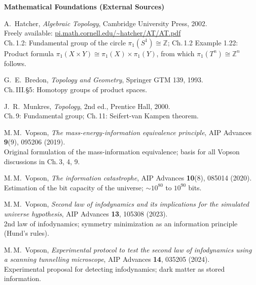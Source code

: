 \bigskip
\noindent\textbf{Mathematical Foundations (External Sources)}

\begin{description}[leftmargin=3.5em,style=sameline,itemsep=0.4em]

\item[{[T1]}] A.~Hatcher, \textit{Algebraic Topology},
  Cambridge University Press, 2002.\\
  Freely available: \href{https://pi.math.cornell.edu/~hatcher/AT/AT.pdf}{pi.math.cornell.edu/\textasciitilde hatcher/AT/AT.pdf}\\
  Ch.\,1.2: Fundamental group of the circle $\pi_1(S^1) \cong \mathbb{Z}$;
  Ch.\,1.2 Example 1.22: Product formula $\pi_1(X \times Y) \cong \pi_1(X) \times \pi_1(Y)$,
  from which $\pi_1(T^n) \cong \mathbb{Z}^n$ follows.

\item[{[T2]}] G.~E.~Bredon, \textit{Topology and Geometry},
  Springer GTM 139, 1993.\\
  Ch.\,III.§5: Homotopy groups of product spaces.

\item[{[T3]}] J.~R.~Munkres, \textit{Topology}, 2nd ed.,
  Prentice Hall, 2000.\\
  Ch.\,9: Fundamental group; Ch.\,11: Seifert-van Kampen theorem.

\end{description}

\begin{description}[leftmargin=3.5em,style=sameline,itemsep=0.4em]

\item[{[V1]}] M.\,M.~Vopson,
  \textit{The mass-energy-information equivalence principle},
  AIP Advances \textbf{9}(9), 095206 (2019).\\
  Original formulation of the mass-information equivalence;
  basis for all Vopson discussions in Ch.\,3, 4, 9.

\item[{[V2]}] M.\,M.~Vopson,
  \textit{The information catastrophe},
  AIP Advances \textbf{10}(8), 085014 (2020).\\
  Estimation of the bit capacity of the universe;
  $\sim 10^{80}$ to $10^{90}$ bits.

\item[{[V3]}] M.\,M.~Vopson,
  \textit{Second law of infodynamics and its implications
  for the simulated universe hypothesis},
  AIP Advances \textbf{13}, 105308 (2023).\\
  2nd law of infodynamics; symmetry minimization as an
  information principle (Hund's rules).

\item[{[V4]}] M.\,M.~Vopson,
  \textit{Experimental protocol to test the second law of
  infodynamics using a scanning tunnelling microscope},
  AIP Advances \textbf{14}, 035205 (2024).\\
  Experimental proposal for detecting infodynamics;
  dark matter as stored information.

\end{description}

